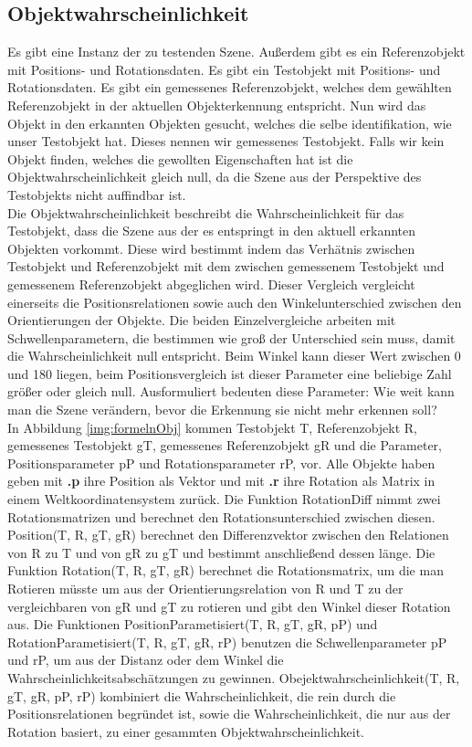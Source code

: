 \subsection{Objektwahrscheinlichkeit}
Es gibt eine Instanz der zu testenden Szene. Außerdem gibt es ein Referenzobjekt mit Positions- und Rotationsdaten. Es gibt ein Testobjekt mit Positions- und Rotationsdaten. Es gibt ein gemessenes Referenzobjekt, welches dem gewählten Referenzobjekt in der aktuellen Objekterkennung entspricht. Nun wird das Objekt in den erkannten Objekten gesucht, welches die selbe identifikation, wie unser Testobjekt hat. Dieses nennen wir gemessenes Testobjekt. Falls wir kein Objekt finden, welches die gewollten Eigenschaften hat ist die Objektwahrscheinlichkeit gleich null, da die Szene aus der Perspektive des Testobjekts nicht auffindbar ist.\smallskip\\
Die Objektwahrscheinlichkeit beschreibt die Wahrscheinlichkeit für das Testobjekt, dass die Szene aus der es entspringt in den aktuell erkannten Objekten vorkommt. Diese wird bestimmt indem das Verhätnis zwischen Testobjekt und Referenzobjekt mit dem zwischen gemessenem Testobjekt und gemessenem Referenzobjekt abgeglichen wird. Dieser Vergleich vergleicht einerseits die Positionsrelationen sowie auch den Winkelunterschied zwischen den Orientierungen der Objekte. Die beiden Einzelvergleiche arbeiten mit Schwellenparametern, die bestimmen wie groß der Unterschied sein muss, damit die Wahrscheinlichkeit null entspricht. Beim Winkel kann dieser Wert zwischen 0 und 180 liegen, beim Positionsvergleich ist dieser Parameter eine beliebige Zahl größer oder gleich null. Ausformuliert bedeuten diese Parameter: Wie weit kann man die Szene verändern, bevor die Erkennung sie nicht mehr erkennen soll?\smallskip\\
In Abbildung \ref{img:formelnObj} kommen Testobjekt T, Referenzobjekt R, gemessenes Testobjekt gT, gemessenes Referenzobjekt gR und die Parameter, Positionsparameter pP und Rotationsparameter rP, vor. Alle Objekte haben geben mit \textbf{.p} ihre Position als Vektor und mit \textbf{.r} ihre Rotation als Matrix in einem Weltkoordinatensystem zurück. Die Funktion RotationDiff nimmt zwei Rotationsmatrizen und berechnet den Rotationsunterschied zwischen diesen. Position(T, R, gT, gR) berechnet den Differenzvektor zwischen den Relationen von R zu T und von gR zu gT und bestimmt anschließend dessen länge. Die Funktion Rotation(T, R, gT, gR) berechnet die Rotationsmatrix, um die man Rotieren müsste um aus der Orientierungsrelation von R und T zu der vergleichbaren von gR und gT zu rotieren und gibt den Winkel dieser Rotation aus. Die Funktionen PositionParametisiert(T, R, gT, gR, pP) und RotationParametisiert(T, R, gT, gR, rP) benutzen die Schwellenparameter pP und rP, um aus der Distanz oder dem Winkel die Wahrscheinlichkeitsabschätzungen zu gewinnen. Obejektwahrscheinlichkeit(T, R, gT, gR, pP, rP) kombiniert die Wahrscheinlichkeit, die rein durch die Positionsrelationen begründet ist, sowie die Wahrscheinlichkeit, die nur aus der Rotation basiert, zu einer gesammten Objektwahrscheinlichkeit.\smallskip\\
